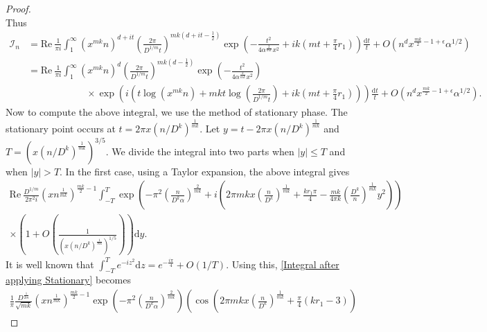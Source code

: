\documentclass[reqno]{amsart}
\numberwithin{equation}{section}
\theoremstyle{plain}
\begin{document}
\begin{proof}
\begin{equation*}
\end{equation*}
Thus
\begin{align} \label{Integral I_n}
	\mathcal{I}_n 
	&= \text{Re} \ \frac{1}{\pi i} \int_{1}^{\infty} 
	\left(x^{mk}n\right)^{d+it} 
	\left(\frac{2\pi}{D^{1/m}t}\right)^{mk\left(d+it-\frac{1}{2}\right)} 
	\exp\left(-\frac{t^2}{4\alpha^{\frac{2}{mk}}x^2} 
	+ ik\left(mt + \frac{\pi}{4}r_1\right)\right) 
	\frac{\mathrm{d}t}{t} + O\left( n^d x^{\frac{mk}{2}-1+\epsilon}\alpha^{1/2}\right)\\[1ex]
\nonumber	&= \text{Re} \ \frac{1}{\pi i} \int_{1}^{\infty} 
	\left(x^{mk}n\right)^d 
	\left(\frac{2\pi}{D^{1/m}t}\right)^{mk\left(d - \frac{1}{2}\right)} 
	\exp\left(-\frac{t^2}{4\alpha^{\frac{2}{mk}}x^2}\right) \\
\nonumber	&\quad \quad \quad \quad \quad \quad  \times \exp\left( i\left(
	t\log\left(x^{mk}n\right) 
	+ mkt\log\left(\frac{2\pi}{D^{1/m}t}\right) 
	+ ik\left(mt + \frac{\pi}{4}r_1\right)
	\right) \right)
	\frac{\mathrm{d}t}{t}+ O\left( n^d x^{\frac{mk}{2}-1+\epsilon}\alpha^{1/2}\right).
\end{align}
Now to compute the above integral, we use the method of stationary phase. The stationary point occurs at $t= 2\pi x \left(n/D^k\right)^{\frac{1}{mk}}$. Let $y=t-2\pi x \left(n/D^k\right)^{\frac{1}{mk}}$ and $T= \left(x\left(n/D^k\right)^{\frac{1}{mk}}\right)^{3/5}$. We divide the integral into two parts when $|y|\leq T$ and when $|y|> T$.  In the first case, using a Taylor expansion, the above integral gives
\begin{align} \label{Integral after applying Stationary}
\nonumber	\text{Re} \ 
	\frac{D^{1/m}}{2\pi^2 i} \left(xn^{\frac{1}{mk}}\right)^{\frac{mk}{2}-1} 
	\int_{-T}^{T} 
	\exp\left( 
	-\pi^2 \left(\frac{n}{D^k \alpha}\right)^{\frac{2}{mk}} 
	+ i\left( 
	2\pi mkx \left(\frac{n}{D^k}\right)^{\frac{1}{mk}} 
	+ \frac{kr_1\pi}{4} 
	- \frac{mk}{4\pi k} \left(\frac{D^k}{n}\right)^{\frac{1}{mk}} y^2 
	\right) 
	\right) \\
	\times 
	\left( 
	1 + O\left( 
	\frac{1}{\left(x\left(n/D^k\right)^{\frac{1}{mk}}\right)^{1/5}}
	\right) 
	\right)\mathrm{d}y.\ \ \ \ \ \ \ \ \ \ \ \ \ \ \  \ \ \ \ \  \ \ \ \
\end{align}
It is well known that $\int_{-T}^{T} e^{-iz^2} \mathrm{d}z = e^{-\frac{i\pi}{4}} + O\left(1/T\right)$. Using this, \eqref{Integral after applying Stationary} becomes
\begin{align}\label{1st case}
\frac{1}{\pi} \frac{D^{\frac{1}{2m}}}{\sqrt{mk}} \left(xn^{\frac{1}{mk}}\right)^{\frac{mk}{2}-1} \exp\left( -\pi^2\left(\frac{n}{D^k\alpha}\right)^{\frac{2}{mk}}\right) \left(\cos\left(2\pi mk x \left(\frac{n}{D^k}\right)^{\frac{1}{mk}}+ \frac{\pi}{4}(kr_1-3)\right)

\end{align}
\end{proof}
\end{document}
